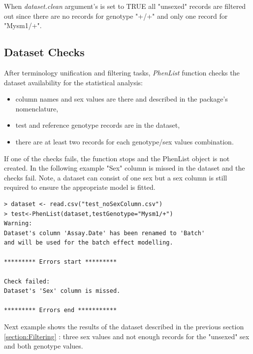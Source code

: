 \documentclass[12pt,a4paper]{article}
\begin{document}
When \textit{dataset.clean} argument's is set to TRUE all "unsexed" records are filtered out since there are no records for genotype "+\slash +" and only one record for "Mysm1\slash +".

\subsection{Dataset Checks}
\label{section:DatasetChecks}
After terminology unification and filtering tasks, \textit{PhenList} function checks the dataset availability for the statistical analysis: 
\begin{itemize}
\item column names and sex values are there and described in the package's nomenclature, 
\item test and reference genotype records are in the dataset, 
\item there are at least two records for each genotype\slash sex values combination.
\end{itemize}If one of the checks fails, the function stops and the PhenList object is not created. In the following example "Sex" column is missed in the dataset and the checks fail. 
Note, a dataset can consist of one sex but a sex column is still required to ensure the appropriate model is fitted.


\begingroup
    \fontsize{8pt}{12pt}\selectfont
\begin{verbatim}
> dataset <- read.csv("test_noSexColumn.csv")
> test<-PhenList(dataset,testGenotype="Mysm1/+")
Warning:
Dataset's column 'Assay.Date' has been renamed to 'Batch' 
and will be used for the batch effect modelling.

********* Errors start *********

Check failed:
Dataset's 'Sex' column is missed.

********* Errors end ***********
\end{verbatim}
\endgroup

Next example shows the results of the dataset described in the previous section \ref{section:Filtering} : three sex values and not enough records for the "unsexed" sex and both genotype values.
\end{document}
